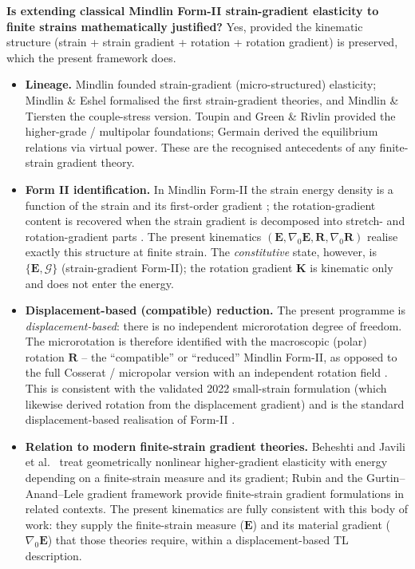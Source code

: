 \documentclass[11pt]{article}
\newcommand{\gradz}{\nabla_{0}}
\newcommand{\bE}{\mathbf{E}}
\newcommand{\bR}{\mathbf{R}}
\newcommand{\gradz}{\nabla_{0}}
\newcommand{\bE}{\mathbf{E}}
\newcommand{\bR}{\mathbf{R}}
\newcommand{\bK}{\mathbf{K}}
\begin{document}
\textbf{Is extending classical Mindlin Form-II strain-gradient
elasticity to finite strains mathematically justified?} Yes, provided
the kinematic structure (strain + strain gradient + rotation + rotation
gradient) is preserved, which the present framework does.

\begin{itemize}
\item \textbf{Lineage.} Mindlin \cite{Mindlin1964,Mindlin1965} founded
strain-gradient (micro-structured) elasticity; Mindlin \& Eshel
\cite{MindlinEshel1968} formalised the first strain-gradient theories,
and Mindlin \& Tiersten \cite{MindlinTiersten1962} the couple-stress
version. Toupin \cite{Toupin1962} and Green \& Rivlin
\cite{GreenRivlin1964} provided the higher-grade / multipolar
foundations; Germain \cite{Germain1973} derived the equilibrium
relations via virtual power. These are the recognised antecedents of
any finite-strain gradient theory.

\item \textbf{Form II identification.} In Mindlin Form-II the strain
energy density is a function of the strain and its first-order gradient
\cite{Mindlin1964,MindlinEshel1968,Aouadi2020}; the rotation-gradient content is
recovered when the strain gradient is decomposed into stretch- and
rotation-gradient parts \cite{FleckHutchinson1997}. The present
kinematics $(\bE,\gradz\bE,\bR,\gradz\bR)$ realise exactly this
structure at finite strain. The \emph{constitutive} state, however, is
$\{\bE,\bm{\mathcal{G}}\}$ (strain-gradient Form-II); the rotation
gradient $\bK$ is kinematic only and does not enter the energy.

\item \textbf{Displacement-based (compatible) reduction.} The present
programme is \emph{displacement-based}: there is no independent
microrotation degree of freedom. The microrotation is therefore
identified with the macroscopic (polar) rotation $\bR$ -- the
``compatible'' or ``reduced'' Mindlin Form-II, as opposed to the
full Cosserat / micropolar version with an independent rotation field
\cite{Koiter1964,Toupin1962}. This is consistent with the validated
2022 small-strain formulation (which likewise derived rotation from the
displacement gradient) and is the standard displacement-based
realisation of Form-II \cite{AskesAifantis2011,LazarMaugin2005}.

\item \textbf{Relation to modern finite-strain gradient theories.}
Beheshti \cite{Beheshti2016} and Javili et al.\ \cite{Javili2013}
treat geometrically nonlinear higher-gradient elasticity with energy
depending on a finite-strain measure and its gradient; Rubin
\cite{Rubin2008} and the Gurtin--Anand--Lele gradient framework
\cite{GurtinAnandLele2007} provide finite-strain gradient
formulations in related contexts. The present kinematics are fully
consistent with this body of work: they supply the finite-strain
measure ($\bE$) and its material gradient ($\gradz\bE$) that those
theories require, within a displacement-based TL description.


\end{itemize}
\end{document}
